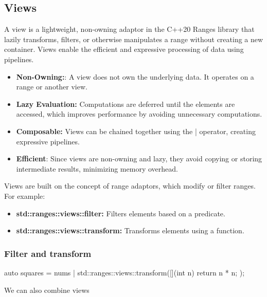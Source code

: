 \documentclass{report}
\begin{document}
     \subsection{Views}
     \bigbreak \noindent 
     A view is a lightweight, non-owning adaptor in the C++20 Ranges library that lazily transforms, filters, or otherwise manipulates a range without creating a new container. Views enable the efficient and expressive processing of data using pipelines.
     \begin{itemize}
         \item \textbf{Non-Owning:}: A view does not own the underlying data. It operates on a range or another view.
         \item \textbf{Lazy Evaluation:} Computations are deferred until the elements are accessed, which improves performance by avoiding unnecessary computations.
         \item \textbf{Composable:} Views can be chained together using the | operator, creating expressive pipelines.
         \item \textbf{Efficient}: Since views are non-owning and lazy, they avoid copying or storing intermediate results, minimizing memory overhead.
     \end{itemize}
     \bigbreak \noindent 
     Views are built on the concept of range adaptors, which modify or filter ranges. For example:
     \begin{itemize}
         \item \textbf{std::ranges::views::filter:} Filters elements based on a predicate.
         \item \textbf{std::ranges::views::transform:} Transforms elements using a function.
     \end{itemize}
     \bigbreak \noindent 
     \subsubsection{Filter and transform}
         \bigbreak \noindent 
         \begin{cppcode}
         auto squares = nums | std::ranges::views::transform([](int n) { return n * n; });
         \end{cppcode}
         \bigbreak \noindent 
         We can also combine views
         \bigbreak \noindent 
\end{document}

